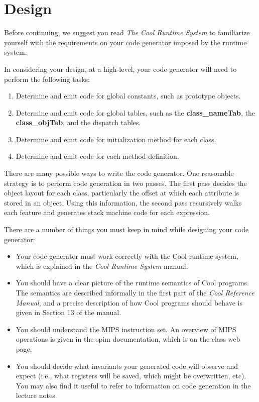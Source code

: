 \documentclass[11pt]{article}
\def\U#1{{\sf{}#1}}
\def\C#1{{\bf{}#1}}
\begin{document}
\section{Design}

Before continuing, we suggest you read \emph{The Cool Runtime System}
to familiarize yourself with the requirements on your code generator
imposed by the runtime system.

In considering your design, at a high-level, your code generator will
need to perform the following tasks:
\begin{enumerate}
  \item Determine and emit code for global constants, such as
        prototype objects.
  \item Determine and emit code for global tables, such as the
        \C{class\_nameTab}, the \C{class\_objTab}, and the dispatch
        tables.
  \item Determine and emit code for initialization method for
        each class.
  \item Determine and emit code for each method definition.
\end{enumerate}

There are many possible ways to write the code generator.  One
reasonable strategy is to perform code generation in two passes.  The
first pass decides the object layout for each class, particularly the
offset at which each attribute is stored in an object.  Using this
information, the second pass recursively walks each feature and
generates stack machine code for each expression.

There are a number of things you must keep in mind while designing
your code generator:
\begin{itemize}

\item Your code generator must work correctly with the Cool runtime
system, which is explained in the {\em Cool Runtime System} manual.

\item You should have a clear picture of the runtime semantics of Cool
programs.  The semantics are described informally in the first part of
the \emph{Cool Reference Manual}, and a precise description of how
Cool programs should behave is given in Section 13 of the manual.

\item You should understand the MIPS instruction set.  An overview of
MIPS operations is given in the \U{spim} documentation, which is
on the class web page.

\item You should decide what invariants your generated code will
observe and expect (i.e., what registers will be saved, which might be
overwritten, etc).  You may also find it useful to refer to information
on code generation in the lecture notes.
\end{itemize}
\end{document}
